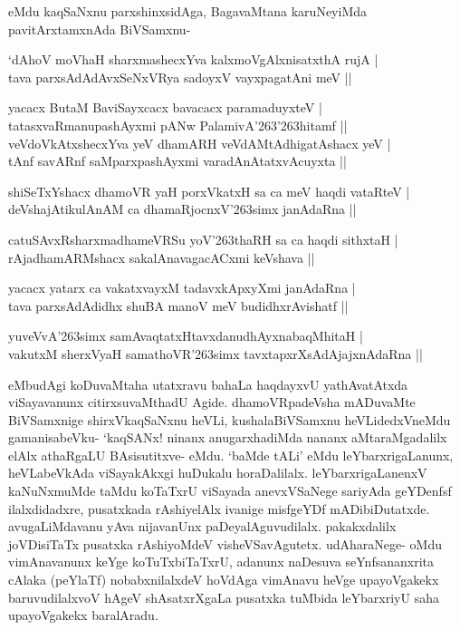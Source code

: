 \noindent
eMdu kaqSaNxnu parxshinxsidAga, BagavaMtana karuNeyiMda pavitArxtamxnAda BiVSamxnu-

\begin{shloka}
`dAhoV moVhaH sharxmashecxYva kalxmoVgAlxnisatxthA rujA |\\
tava parxsAdAdAvxSeNxVRya sadoyxV vayxpagatAni meV ||
\end{shloka}

\begin{shloka}
yacacx ButaM BaviSayxcacx bavacacx paramaduyxteV |\\
tatasxvaRmanupashAyxmi pANw PalamivA\char'263\char'263hitamf ||\\
veVdoVkAtxshecxYva yeV dhamARH veVdAMtAdhigatAshacx yeV |\\
tAnf savARnf saMparxpashAyxmi varadAnAtatxvAcuyxta ||
\end{shloka}

\begin{shloka}
shiSeTxYshacx dhamoVR yaH porxVkatxH sa ca meV haqdi vataRteV |\\
deVshajAtikulAnAM ca dhamaRjocnxV\char'263simx janAdaRna ||
\end{shloka}

\begin{shloka}
catuSAvxRsharxmadhameVRSu yoV\char'263thaRH sa ca haqdi sithxtaH |\\
rAjadhamARMshacx sakalAnavagacACxmi keVshava ||
\end{shloka}

\begin{shloka}
yacacx yatarx ca vakatxvayxM tadavxkApxyXmi janAdaRna |\\
tava parxsAdAdidhx shuBA manoV meV budidhxrAvishatf ||
\end{shloka}

\begin{shloka}
yuveVvA\char'263simx samAvaqtatxHtavxdanudhAyxnabaqMhitaH |\\
vakutxM sherxVyaH samathoVR\char'263simx tavxtapxrXsAdAjajxnAdaRna ||
\end{shloka}

\noindent
eMbudAgi koDuvaMtaha utatxravu bahaLa haqdayxvU yathAvatAtxda viSayavanunx citirxsu\-vaMthadU Agide. dhamoVRpadeVsha mADuvaMte BiVSamxnige shirxVkaqSaNxnu heVLi, kushalaBiVSamxnu heVLidedxVneMdu gamanisa\-beVku- `kaqSANx! ninanx anugarxhadiMda nananx aMtaraMgadalilx elAlx athaRgaLU BAsisutitxve- eMdu. `baMde tALi' eMdu leYbarxrigaLanunx, heVLabeVkAda viSayakAkxgi huDukalu horaDalilalx. leYbarxrigaLanenxV kaNuNx\-muMde taMdu koTaTxrU viSayada anevxVSaNege sariyAda geYDenfsf ilalxdidadxre, pusatxkada rAshi\-yelAlx ivanige misfgeYDf mADibiDutatxde. avugaLiMdavanu yAva nijavanUnx paDeyalAguvudilalx. pakakx\-dalilx joVDisiTaTx pusatxka rAshiyoMdeV visheVSavAgutetx. udAharaNege- oMdu vimAnavanunx keYge koTuTx\-biTaTxrU, adanunx naDesuva seYnfsananxrita cAlaka (peYlaTf) nobabxnilalxdeV hoVdAga vimAnavu heVge upa\-yoVgakekx baruvudilalxvoV hAgeV shAsatxrXgaLa pusatxka tuMbida leYbarxriyU saha upayoVgakekx bara\-lAradu.

